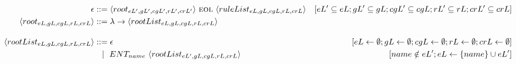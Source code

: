 \begin{landscape}
    \centering
    \begin{adjustbox}{max width=\linewidth,max height=.95\textheight,valign=c}
        \parbox{\linewidth}{\begin{align}
                \epsilon                                    & ::= \langle root_{eL',gL',cgL',rL',crL'} \rangle ~\textsc{eol}~ \langle ruleList_{eL,gL,cgL,rL,crL} \rangle                                                                                                                                                                                                                                                                                  & [eL' \subseteq eL; gL' \subseteq gL; cgL' \subseteq cgL; rL' \subseteq rL; crL' \subseteq crL]                    \label{meta:start}      \\
                \langle root_{eL,gL,cgL,rL,crL} \rangle     & ::= \lambda \to \langle rootList_{eL,gL,cgL,rL,crL} \rangle                                                                                                                                                                                                                                                                                                           \label{meta:root}                                                                                                                                                  \\[1em]
                \langle rootList_{eL,gL,cgL,rL,crL} \rangle & ::= \epsilon                                                                                                                                                                                                                                                                                                                                                                                 & [eL \gets \emptyset; gL \gets \emptyset; cgL \gets \emptyset; rL \gets \emptyset; crL \gets \emptyset]            \label{meta:rootList:1} \\
                                                            & ~~ \mid ~ ENT_{name}  ~ \langle rootList_{eL',gL,cgL,rL,crL} \rangle                                                                                                                                                                                                                                                                                                                         & [name \notin eL'; eL \gets \{name\} \cup eL']                                                                     \label{meta:rootList:2} \\

\end{align}}
\end{adjustbox}
\end{landscape}
